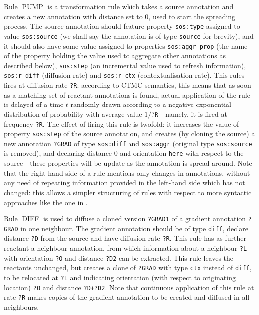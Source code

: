 \documentclass[12pt,a4paper,twoside,openright]{book}
\begin{document}
Rule [PUMP] is a transformation rule which takes a source annotation and creates a new annotation with distance set to $0$, used to start the spreading process.
%
The source annotation should feature property \texttt{sos:type} assigned to value \texttt{sos:source} (we shall say the annotation is of type \texttt{source} for brevity), and it should also have some value assigned to properties \texttt{sos:aggr\_prop} (the name of the property holding the value used to aggregate other annotations as described below), \texttt{sos:step} (an incremental value used to refresh information), \texttt{sos:r\_diff} (diffusion rate) and \texttt{sos:r\_ctx} (contextualisation rate).
%
This rules fires at diffusion rate \texttt{?R}: according to CTMC semantics, this means that as soon as a matching set of reactant annotations is found, actual application of the rule is delayed of a time $t$ randomly drawn according to a negative exponential distribution of probability with average value $1/\texttt{?R}$---namely, it is fired at frequency \texttt{?R}.
%
The effect of firing this rule is twofold: it increases the value of property \texttt{sos:step} of the source annotation, and creates (by cloning the source) a new annotation \texttt{?GRAD} of type \texttt{sos:diff} and \texttt{sos:aggr} (original type \texttt{sos:source} is removed), and declaring distance $0$ and orientation \texttt{here} with respect to the source---these properties will be update as the annotation is spread around.
%
Note that the right-hand side of a rule mentions only changes in annotations, without any need of repeating information provided in the left-hand side which has not changed: this allows a simpler structuring of rules with respect to more syntactic approaches like the one in \cite{mass2011}.

Rule [DIFF] is used to diffuse a cloned version \texttt{?GRAD1} of a gradient annotation \texttt{?GRAD} in one neighbour.
%
The gradient annotation should be of type \texttt{diff}, declare distance \texttt{?D} from the source and have diffusion rate \texttt{?R}.
%
This rule has as further reactant a neighbour annotation, from which information about a neighbour \texttt{?L} with orientation \texttt{?O} and distance \texttt{?D2} can be extracted.
%
This rule leaves the reactants unchanged, but creates a clone of \texttt{?GRAD} with type \texttt{ctx} instead of \texttt{diff}, to be relocated at \texttt{?L} and indicating orientation (with respect to originating location) \texttt{?O} and distance \texttt{?D+?D2}.
%
Note that continuous application of this rule at rate \texttt{?R} makes copies of the gradient annotation to be created and diffused in all neighbours.
\end{document}
